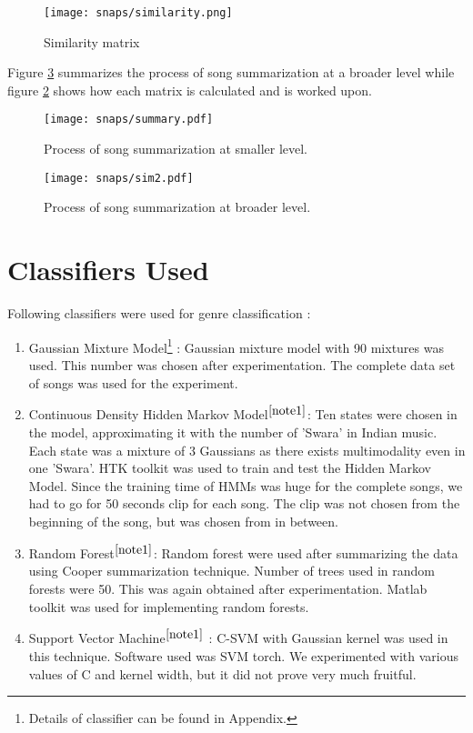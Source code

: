 \begin{figure}[!htbp]
\centering
\texttt{[image: snaps/similarity.png]}
\caption{Similarity matrix}
\label{fig:sim}
\end{figure}
Figure \ref{fig:sim2} summarizes the process of song summarization at a broader level while figure \ref{fig:sim3} shows how each matrix is calculated and is worked upon.
\begin{figure}[!htbp]
\centering
\texttt{[image: snaps/summary.pdf]}
\caption{Process of song summarization at smaller level.}
\label{fig:sim3}
\end{figure}
\begin{figure}[!htbp]
\centering
\texttt{[image: snaps/sim2.pdf]}
\caption{Process of song summarization at broader level.}
\label{fig:sim2}
\end{figure}
\pagebreak

\section{Classifiers Used}
Following classifiers were used for genre classification :
\begin{enumerate}
\item Gaussian Mixture Model\footnote{\label{note1} Details of classifier can be found in Appendix.} : Gaussian mixture model with 90 mixtures was used. This number was chosen after experimentation. The complete data set of songs was used for the experiment.
\item Continuous Density Hidden Markov Model$^{\ref{note1}}$: Ten states were chosen in the model, approximating it with the number of 'Swara' in Indian music. Each state was a mixture of 3 Gaussians as there exists multimodality even in one 'Swara'. HTK toolkit was used to train and test the Hidden Markov Model. Since the training time of HMMs was huge for the complete songs, we had to go for 50 seconds clip for each song. The clip was not chosen from the beginning of the song, but was chosen from in between.
\item Random Forest$^{\ref{note1}}$: Random forest were used after summarizing the data using Cooper summarization technique. Number of trees used in random forests were 50. This was again obtained after experimentation. Matlab toolkit was used for implementing random forests.
\item Support Vector Machine$^{\ref{note1}}$ : C-SVM with Gaussian kernel was used in this technique. Software used was SVM torch. We experimented with various values of C and kernel width, but it did not prove very much fruitful. 
\end{enumerate}
